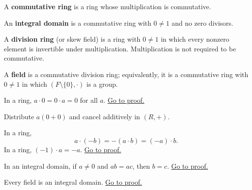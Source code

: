 \begin{definition}
\label{def:commutative-ring}
A \textbf{commutative ring} is a ring whose multiplication is commutative.
\end{definition}

\begin{definition}
\label{def:integral-domain}
An \textbf{integral domain} is a commutative ring with $0\neq 1$ and no
zero divisors.
\end{definition}

\begin{definition}
\label{def:division-ring}
A \textbf{division ring} (or skew field) is a ring with $0\neq 1$ in which
every nonzero element is invertible under multiplication. Multiplication is
not required to be commutative.
\end{definition}

\begin{definition}[Field]
\label{def:field}
A \textbf{field} is a commutative division ring; equivalently, it is a
commutative ring with $0\neq 1$ in which $(F\setminus\{0\},\cdot)$ is a
group.
\end{definition}

\begin{proposition}
\label{prop:ring-mult-zero}
In a ring, $a\cdot 0=0\cdot a=0$ for all $a$.
\hyperref[prf:ring-mult-zero]{Go to proof.}
\end{proposition}

\begin{remark*}
Distribute $a(0+0)$ and cancel additively in $(R,+)$.
\end{remark*}

\begin{proposition}
\label{prop:ring-mult-neg}
In a ring,
\[
a\cdot(-b)=-(a\cdot b)=(-a)\cdot b.
\]
In a ring, $(-1)\cdot a=-a$.
\hyperref[prf:ring-mult-neg]{Go to proof.}
\end{proposition}

\begin{proposition}
\label{prop:domain-cancellation}
In an integral domain, if $a\neq 0$ and $ab=ac$, then $b=c$.
\hyperref[prf:domain-cancellation]{Go to proof.}
\end{proposition}

\begin{proposition}
\label{prop:field-is-domain}
Every field is an integral domain.
\hyperref[prf:field-is-domain]{Go to proof.}
\end{proposition}

